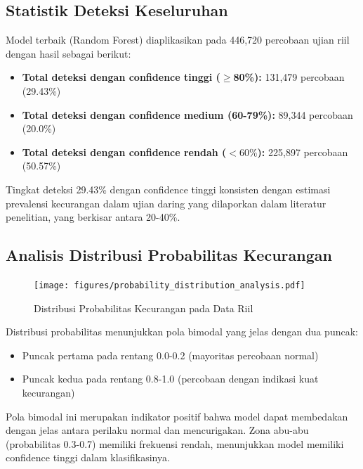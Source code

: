 \subsection{Statistik Deteksi Keseluruhan}
\label{subsec:statistikDeteksiKeseluruhan}

Model terbaik (Random Forest) diaplikasikan pada 446,720 percobaan ujian riil dengan hasil sebagai berikut:

\begin{itemize}
    \item \textbf{Total deteksi dengan confidence tinggi ($\geq$80\%):} 131,479 percobaan (29.43\%)
    \item \textbf{Total deteksi dengan confidence medium (60-79\%):} 89,344 percobaan (20.0\%)
    \item \textbf{Total deteksi dengan confidence rendah ($<60\%$):} 225,897 percobaan (50.57\%)
\end{itemize}

Tingkat deteksi 29.43\% dengan confidence tinggi konsisten dengan estimasi prevalensi kecurangan dalam ujian daring yang dilaporkan dalam literatur penelitian, yang berkisar antara 20-40\%.

\subsection{Analisis Distribusi Probabilitas Kecurangan}
\label{subsec:analisisDistribusiProbabilitas}

\begin{figure}[htbp]
    \centering
    \texttt{[image: figures/probability\_distribution\_analysis.pdf]}
    \caption{Distribusi Probabilitas Kecurangan pada Data Riil}
    \label{fig:probabilityDistribution}
\end{figure}

Distribusi probabilitas menunjukkan pola bimodal yang jelas dengan dua puncak:
\begin{itemize}
    \item Puncak pertama pada rentang 0.0-0.2 (mayoritas percobaan normal)
    \item Puncak kedua pada rentang 0.8-1.0 (percobaan dengan indikasi kuat kecurangan)
\end{itemize}

Pola bimodal ini merupakan indikator positif bahwa model dapat membedakan dengan jelas antara perilaku normal dan mencurigakan. Zona abu-abu (probabilitas 0.3-0.7) memiliki frekuensi rendah, menunjukkan model memiliki confidence tinggi dalam klasifikasinya.

